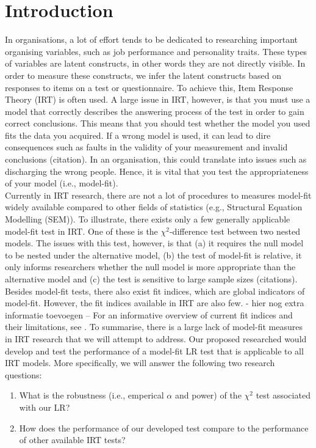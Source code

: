 \documentclass{article}
\begin{document}
\part{Introduction}
In organisations, a lot of effort tends to be dedicated to researching important organising variables, such as job performance and personality traits. These types of variables are latent constructs, in other words they are not directly visible. In order to measure these constructs, we infer the latent constructs based on responses to items on a test or questionnaire. To achieve this, Item Response Theory (IRT) is often used. A large issue in IRT, however, is that you must use a model that correctly describes the answering process of the test in order to gain correct conclusions. This means that you should test whether the model you used fits the data you acquired. If a wrong model is used, it can lead to dire consequences such as faults in the validity of your measurement \autocite{consq1} and invalid conclusions (citation). In an organisation, this could translate into issues such as discharging the wrong people. Hence, it is vital that you test the appropriateness of your model (i.e., model-fit). \\
\indent Currently in IRT research, there are not a lot of procedures to measures model-fit widely available compared to other fields of statistics (e.g., Structural Equation Modelling (SEM)). To illustrate, there exists only a few generally applicable model-fit test in IRT. One of these is the $\chi^2$-difference test between two nested models. The issues with this test, however, is that (a) it requires the null model to be nested under the alternative model, (b) the test of model-fit is relative, it only informs researchers whether the null model is more appropriate than the alternative model and (c) the test is sensitive to large sample sizes (citations). Besides model-fit tests, there also exist fit indices, which are global indicators of model-fit. However, the fit indices available in IRT are also few. - hier nog extra informatie toevoegen -- For an informative overview of current fit indices and their limitations, see \textcite{ref1}. To summarise, there is a large lack of model-fit measures in IRT research that we will attempt to address.
\indent Our proposed researched would develop and test the performance of a model-fit LR test that is applicable to all IRT models. More specifically, we will answer the following two research questions:
\begin{enumerate}
\item What is the robustness (i.e., emperical $\alpha$ and power) of the $\chi^2$ test associated with our LR?
\item How does the performance of our developed test compare to the performance of other available IRT tests?
\end{enumerate}
\end{document}
